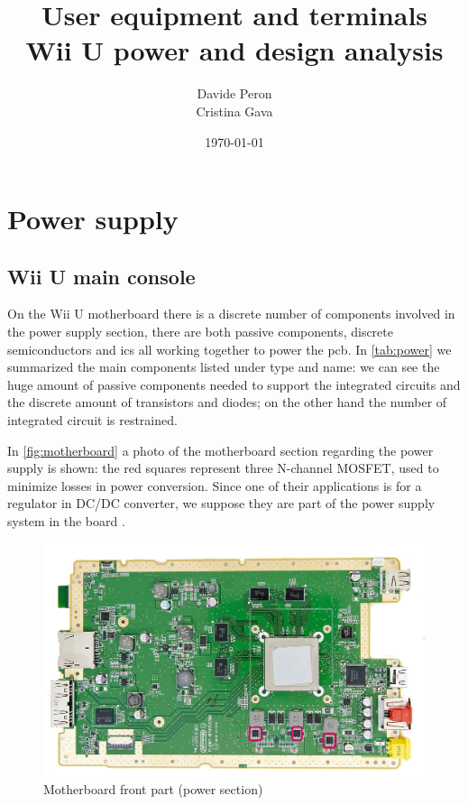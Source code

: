 \documentclass[11pt,a4paper,titlepage]{article}
\title{\blue User equipment and terminals \\
\blueb Wii U power and design analysis}
\author{Davide Peron\\ Cristina Gava}
\date{\today}
\begin{document}
\maketitle

\tableofcontents
\clearpage

\section{Power supply}
  \subsection{Wii U main console}
		  On the Wii U motherboard there is a discrete number of components involved in the power supply section, there are both passive components, discrete semiconductors and \glspl{ic} all working together to power the \gls{pcb}. In \autoref{tab:power} we summarized the main components listed under type and name: we can see the huge amount of passive components needed to support the integrated circuits and the discrete amount of transistors and		  diodes; on the other hand the number of integrated circuit is restrained.

		  In \autoref{fig:motherboard} a photo of the motherboard section regarding the power supply is shown: the red squares represent three N-channel MOSFET, used to minimize losses in power conversion. Since one of their applications is for a regulator in DC/DC converter, we suppose they are part of the power supply system in the board \cite{mosfet8026}.

		  \begin{figure}
				\centering
				\includegraphics[width = .85\textwidth]{motherboard_front.png}
				\caption{Motherboard front part (power section)}
				\label{fig:motherboard}
		  \end{figure}
\end{document}
